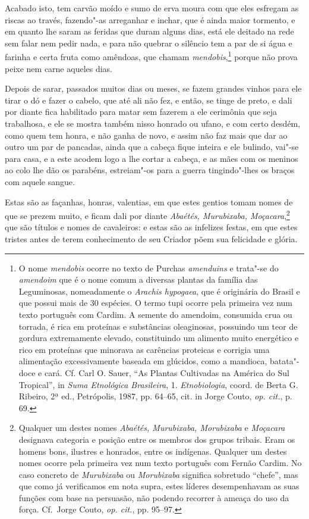 \begin{linenumbers}
 Acabado isto, tem carvão moído e sumo de erva moura com que eles
esfregam as riscas ao través, fazendo"-as arreganhar e inchar, que é
ainda maior tormento, e em quanto lhe saram as feridas que duram alguns
dias, está ele deitado na rede sem falar nem pedir nada, e para não
quebrar o silêncio tem a par de si água e farinha e certa fruta como
amêndoas, que chamam \textit{mendobis},\footnote{ O nome
\textit{mendobis} ocorre no texto de Purchas \textit{amenduins} e 
trata"-se do \textit{amendoim} que é o nome comum a diversas plantas da
família das Leguminosas, nomeadamente o \textit{Arachis hypogaea}, que
é originária do Brasil e que possui mais de 30 espécies. O termo tupi
ocorre pela primeira vez num texto português com Cardim. A semente do
amendoim, consumida crua ou torrada, é rica em proteínas e substâncias
oleaginosas, possuindo um teor de gordura extremamente elevado,
constituindo um alimento muito energético e rico em proteínas que
minorava as carências proteicas e corrigia uma alimentação
excessivamente baseada em glúcidos, como a mandioca, batata"-doce e
cará. Cf. Carl O. Sauer, ``As Plantas Cultivadas na América do Sul
Tropical'', in \textit{Suma Etnológica Brasileira}, 
1. \textit{Etnobiologia}, coord. de Berta G. Ribeiro, 2ª ed., Petrópolis,
1987, pp. 64--65, cit. in Jorge Couto, \textit{op. cit.}, p. 69.} 
porque não prova peixe nem carne aqueles dias.

 Depois de sarar, passados muitos dias ou meses, se fazem grandes vinhos
para ele tirar o dó e fazer o cabelo, que até ali não fez, e então, se
tinge de preto, e dali por diante fica habilitado para matar sem
fazerem a ele cerimônia que seja trabalhosa, e ele se mostra também
nisso honrado ou ufano, e com certo desdém, como quem tem honra, e não
ganha de novo, e assim não faz mais que dar ao outro um par de
pancadas, ainda que a cabeça fique inteira e ele bulindo, vai"-se para
casa, e a este acodem logo a lhe cortar a cabeça, e as mães com os
meninos ao colo lhe dão os parabéns, estreiam"-os para a guerra
tingindo"-lhes os braços com aquele sangue.

 Estas são as façanhas, honras, valentias, em que estes gentios tomam
nomes de que se prezem muito, e ficam dali por diante \textit{Abaétés,
Murubixaba, Moçacara},\footnote{ Qualquer um destes nomes
\textit{Abaétés, Murubixaba, Morubixaba} e \textit{Moçacara}
designava categoria e posição entre os membros dos grupos tribais.
Eram os homens bons, ilustres e honrados, entre os indígenas. Qualquer
um destes nomes ocorre pela primeira vez num texto português com Fernão
Cardim. No caso concreto de \textit{Murubixaba} ou \textit{Morubixaba}
significa sobretudo ``chefe'', mas que como já verificamos em nota
supra, estes líderes desempenhavam as suas funções com base na
persuasão, não podendo recorrer à ameaça do uso da força. Cf.~Jorge
Couto, \textit{op. cit.}, pp. 95--97.} que são títulos e nomes
de cavaleiros: e estas são as infelizes festas, em que estes tristes
antes de terem conhecimento de seu Criador põem sua felicidade e glória.


\end{linenumbers}
